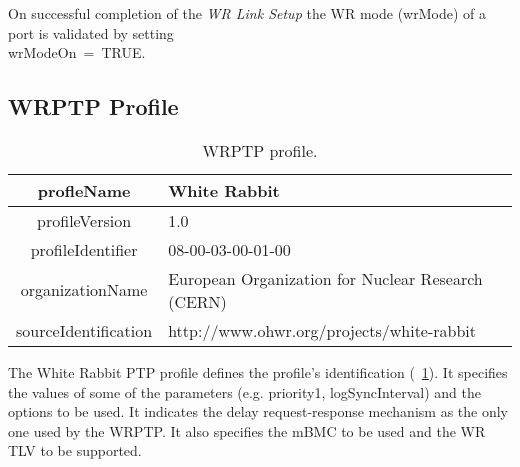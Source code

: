 On successful completion of the \textit{WR Link Setup} the WR mode (wrMode) 
of a port is validated by setting \\ wrModeOn~=~TRUE. 




\subsection{WRPTP Profile}

\begin{table}[!t]
\caption{WRPTP profile.}
\centering
\begin{tabular}{| c | p{5cm} |}          					\hline
profleName           &  White Rabbit     				  \\ \hline
profileVersion       &  1.0               				  \\ \hline
profileIdentifier    &  08-00-03-00-01-00 				  \\ \hline
organizationName     &  European Organization for Nuclear Research (CERN) \\ \hline
sourceIdentification &  http://www.ohwr.org/projects/white-rabbit         \\ \hline
\end{tabular}
\label{tab:wrPtpProfile}
\end{table}


The White Rabbit PTP profile defines the profile's identification 
(\tablename~\ref{tab:wrPtpProfile}). It specifies the values of some of the parameters
(e.g. priority1, logSyncInterval) and the options to be used. 
It indicates the delay request-response mechanism as the only one used by
the WRPTP. It also specifies the mBMC to be used and the WR TLV to be supported.






